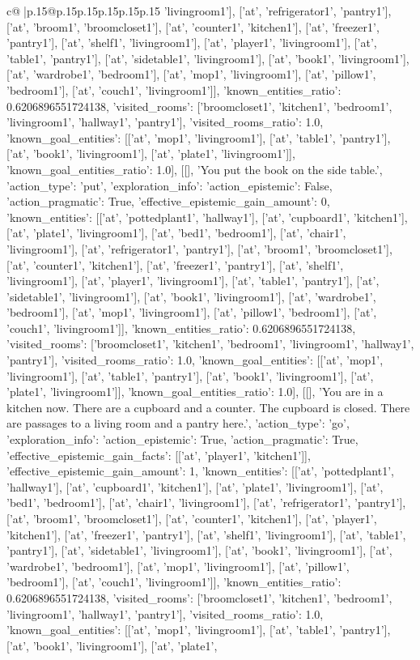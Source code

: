 \documentclass{article}
\begin{document}
{\begin{supertabular}{c@{$\;$}|p{.15\linewidth}@{}p{.15\linewidth}p{.15\linewidth}p{.15\linewidth}p{.15\linewidth}p{.15\linewidth}}
{{{'livingroom1'], ['at', 'refrigerator1', 'pantry1'], ['at', 'broom1', 'broomcloset1'], ['at', 'counter1', 'kitchen1'], ['at', 'freezer1', 'pantry1'], ['at', 'shelf1', 'livingroom1'], ['at', 'player1', 'livingroom1'], ['at', 'table1', 'pantry1'], ['at', 'sidetable1', 'livingroom1'], ['at', 'book1', 'livingroom1'], ['at', 'wardrobe1', 'bedroom1'], ['at', 'mop1', 'livingroom1'], ['at', 'pillow1', 'bedroom1'], ['at', 'couch1', 'livingroom1']], 'known_entities_ratio': 0.6206896551724138, 'visited_rooms': ['broomcloset1', 'kitchen1', 'bedroom1', 'livingroom1', 'hallway1', 'pantry1'], 'visited_rooms_ratio': 1.0, 'known_goal_entities': [['at', 'mop1', 'livingroom1'], ['at', 'table1', 'pantry1'], ['at', 'book1', 'livingroom1'], ['at', 'plate1', 'livingroom1']], 'known_goal_entities_ratio': 1.0}}], [[], 'You put the book on the side table.', {'action_type': 'put', 'exploration_info': {'action_epistemic': False, 'action_pragmatic': True, 'effective_epistemic_gain_amount': 0, 'known_entities': [['at', 'pottedplant1', 'hallway1'], ['at', 'cupboard1', 'kitchen1'], ['at', 'plate1', 'livingroom1'], ['at', 'bed1', 'bedroom1'], ['at', 'chair1', 'livingroom1'], ['at', 'refrigerator1', 'pantry1'], ['at', 'broom1', 'broomcloset1'], ['at', 'counter1', 'kitchen1'], ['at', 'freezer1', 'pantry1'], ['at', 'shelf1', 'livingroom1'], ['at', 'player1', 'livingroom1'], ['at', 'table1', 'pantry1'], ['at', 'sidetable1', 'livingroom1'], ['at', 'book1', 'livingroom1'], ['at', 'wardrobe1', 'bedroom1'], ['at', 'mop1', 'livingroom1'], ['at', 'pillow1', 'bedroom1'], ['at', 'couch1', 'livingroom1']], 'known_entities_ratio': 0.6206896551724138, 'visited_rooms': ['broomcloset1', 'kitchen1', 'bedroom1', 'livingroom1', 'hallway1', 'pantry1'], 'visited_rooms_ratio': 1.0, 'known_goal_entities': [['at', 'mop1', 'livingroom1'], ['at', 'table1', 'pantry1'], ['at', 'book1', 'livingroom1'], ['at', 'plate1', 'livingroom1']], 'known_goal_entities_ratio': 1.0}}], [[], 'You are in a kitchen now. There are a cupboard and a counter. The cupboard is closed. There are passages to a living room and a pantry here.', {'action_type': 'go', 'exploration_info': {'action_epistemic': True, 'action_pragmatic': True, 'effective_epistemic_gain_facts': [['at', 'player1', 'kitchen1']], 'effective_epistemic_gain_amount': 1, 'known_entities': [['at', 'pottedplant1', 'hallway1'], ['at', 'cupboard1', 'kitchen1'], ['at', 'plate1', 'livingroom1'], ['at', 'bed1', 'bedroom1'], ['at', 'chair1', 'livingroom1'], ['at', 'refrigerator1', 'pantry1'], ['at', 'broom1', 'broomcloset1'], ['at', 'counter1', 'kitchen1'], ['at', 'player1', 'kitchen1'], ['at', 'freezer1', 'pantry1'], ['at', 'shelf1', 'livingroom1'], ['at', 'table1', 'pantry1'], ['at', 'sidetable1', 'livingroom1'], ['at', 'book1', 'livingroom1'], ['at', 'wardrobe1', 'bedroom1'], ['at', 'mop1', 'livingroom1'], ['at', 'pillow1', 'bedroom1'], ['at', 'couch1', 'livingroom1']], 'known_entities_ratio': 0.6206896551724138, 'visited_rooms': ['broomcloset1', 'kitchen1', 'bedroom1', 'livingroom1', 'hallway1', 'pantry1'], 'visited_rooms_ratio': 1.0, 'known_goal_entities': [['at', 'mop1', 'livingroom1'], ['at', 'table1', 'pantry1'], ['at', 'book1', 'livingroom1'], ['at', 'plate1', }}}
\end{supertabular}}
\end{document}
